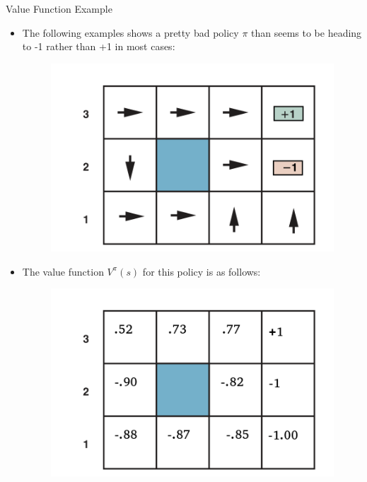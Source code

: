\documentclass[handout]{beamer}
\begin{document}
\begin{frame}{Value Function Example}
\scriptsize
\begin{itemize}
    \item  The following examples shows a pretty bad policy \( \pi \) than seems to be heading to -1 rather than +1 in most cases:
\begin{figure}[h]
        	\includegraphics[scale = 0.4]{pics/example3.png}
        \end{figure}
    \item The value function \( V^{\pi}(s) \) for this policy is as follows:
    
\begin{figure}[h]
        	\includegraphics[scale = 0.4]{pics/example4.png}
        \end{figure}
\end{itemize}
\end{frame}
\end{document}
